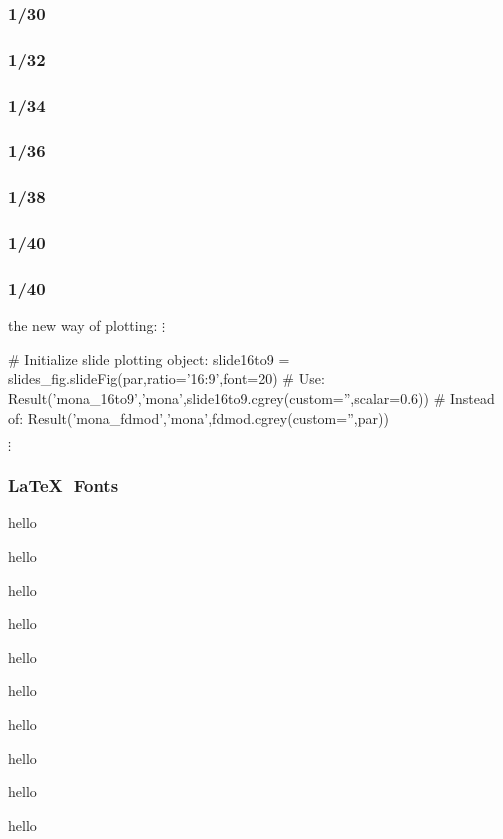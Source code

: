 \begin{frame}\frametitle{1/30}
\end{frame}

\begin{frame}\frametitle{1/32}
\end{frame}

\begin{frame}\frametitle{1/34}
\end{frame}

\begin{frame}\frametitle{1/36}
\end{frame}

\begin{frame}\frametitle{1/38}
\end{frame}

\begin{frame}\frametitle{1/40}
\end{frame}


\begin{frame}\frametitle{1/40}
\end{frame}

\begin{frame}
\end{frame}
\begin{frame}[fragile]{the new way of plotting:}
\centering
$\vdots$
\begin{python}
# Initialize slide plotting object:
slide16to9 = slides_fig.slideFig(par,ratio='16:9',font=20) 
# Use:
Result('mona_16to9','mona',slide16to9.cgrey(custom='',scalar=0.6)) 
# Instead of:
Result('mona_fdmod','mona',fdmod.cgrey(custom='',par))
\end{python}
$\vdots$

\end{frame}


\begin{frame}\frametitle{\LaTeX$\text{ }$Fonts}
\centering
\tiny hello

\scriptsize hello

\footnotesize hello

\small hello

\normalsize hello

\large hello

\Large hello

\LARGE hello

\huge hello

\centering
\Huge hello

\end{frame}





